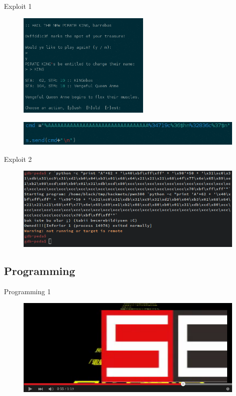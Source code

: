 \documentclass[compress]{beamer}
\begin{document}
\begin{frame}{Exploit 1}
	\begin{figure}
		\centering
		\includegraphics[height=2in]{images/e11.png}
	\end{figure}
	\begin{figure}
		\centering
		\includegraphics[width=\textwidth,height=0.5in]{images/e12.png}
	\end{figure}    
\end{frame}

\begin{frame}{Exploit 2}
	\begin{figure}
		\centering
		\includegraphics[width=\textwidth]{images/e21.png}
	\end{figure}
\end{frame}

\subsection{Programming}

\begin{frame}{Programming 1}
	\begin{figure}
		\centering
		\includegraphics[width=\textwidth]{images/p11.png}
	\end{figure}
\end{frame}
\end{document}
